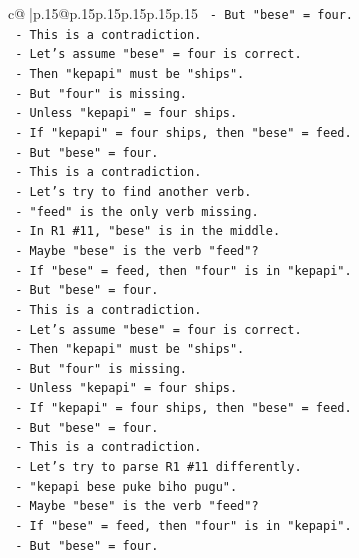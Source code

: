 \documentclass{article}
\begin{document}
{\begin{supertabular}{c@{$\;$}|p{.15\linewidth}@{}p{.15\linewidth}p{.15\linewidth}p{.15\linewidth}p{.15\linewidth}p{.15\linewidth}}
{{{\texttt{        {-} But "bese" = four.} \\
\texttt{        {-} This is a contradiction.} \\
\texttt{        {-} Let's assume "bese" = four is correct.} \\
\texttt{        {-} Then "kepapi" must be "ships".} \\
\texttt{        {-} But "four" is missing.} \\
\texttt{        {-} Unless "kepapi" = four ships.} \\
\texttt{        {-} If "kepapi" = four ships, then "bese" = feed.} \\
\texttt{        {-} But "bese" = four.} \\
\texttt{        {-} This is a contradiction.} \\
\texttt{        {-} Let's try to find another verb.} \\
\texttt{        {-} "feed" is the only verb missing.} \\
\texttt{        {-} In R1 \#11, "bese" is in the middle.} \\
\texttt{        {-} Maybe "bese" is the verb "feed"?} \\
\texttt{        {-} If "bese" = feed, then "four" is in "kepapi".} \\
\texttt{        {-} But "bese" = four.} \\
\texttt{        {-} This is a contradiction.} \\
\texttt{        {-} Let's assume "bese" = four is correct.} \\
\texttt{        {-} Then "kepapi" must be "ships".} \\
\texttt{        {-} But "four" is missing.} \\
\texttt{        {-} Unless "kepapi" = four ships.} \\
\texttt{        {-} If "kepapi" = four ships, then "bese" = feed.} \\
\texttt{        {-} But "bese" = four.} \\
\texttt{        {-} This is a contradiction.} \\
\texttt{        {-} Let's try to parse R1 \#11 differently.} \\
\texttt{        {-} "kepapi bese puke biho pugu".} \\
\texttt{        {-} Maybe "bese" is the verb "feed"?} \\
\texttt{        {-} If "bese" = feed, then "four" is in "kepapi".} \\
\texttt{        {-} But "bese" = four.} \\
}}}
\end{supertabular}}
\end{document}
